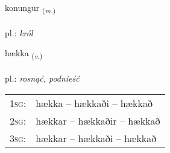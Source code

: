 \documentclass[frontgrid, backgrid]{flacards}\usepackage[]{graphicx}\usepackage[]{xcolor}
\begin{document}
\renewcommand{\flhead}{\vskip5pt \fboxsep=0pt {\small\bfseries\footnotesize Nafnorð | rzeczownik}}
\renewcommand{\fcfoot}{\vskip5pt \fboxsep=0pt \hspace{2pt}{\small\bfseries\footnotesize 1K}}

\renewcommand{\blhead}{\vskip5pt {\small\bfseries\footnotesize Nafnorð | rzeczownik }}
\renewcommand{\bcfoot}{\vskip5pt \hspace{2pt}{\small\bfseries\footnotesize 1K}}


{konungur \small{\textsubscript{(\textit{m.})}} \\[1ex] %
\textphonetic{[kʰɔːnuŋkʏr]} \\
pl.: \emph{król} \\  [2ex]
\renewcommand*{\arraystretch}{0.8}
}

\renewcommand{\flhead}{\vskip5pt \fboxsep=0pt {\small\bfseries\footnotesize Sagnorð | czasownik}}
\renewcommand{\fcfoot}{\vskip5pt \fboxsep=0pt \hspace{2pt}{\small\bfseries\footnotesize 1K}}

\renewcommand{\blhead}{\vskip5pt {\small\bfseries\footnotesize Sagnorð | czasownik }}
\renewcommand{\bcfoot}{\vskip5pt \hspace{2pt}{\small\bfseries\footnotesize 1K}}


{hækka \small{\textsubscript{(\textit{v.})}} \\[1ex] %
\textphonetic{[haihka]} \\
pl.: \emph{rosnąć, podnieść} \\  [2ex]
\renewcommand*{\arraystretch}{0.8}
\begin{tabular}{p{1cm}l}
\textsc{1sg}: & hækka -- hækkaði -- hækkað \\ 
\textsc{2sg}: & hækkar -- hækkaðir -- hækkað \\ 
\textsc{3sg}: & hækkar -- hækkaði -- hækkað \\ 
\end{tabular}
}
\end{document}
